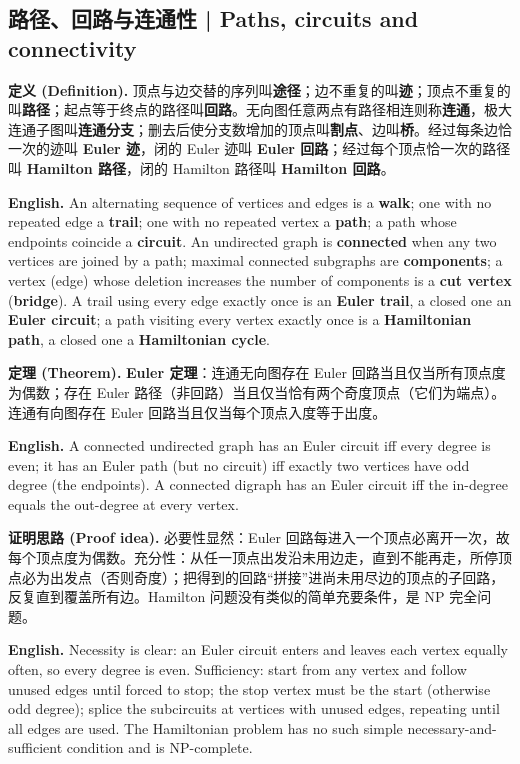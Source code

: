 \documentclass[UTF8,11pt,a4paper]{ctexart}
\newcommand{\EN}[1]{\par\noindent \textbf{English.} #1\par}
\newcommand{\DEF}[2]{\par\noindent\textbf{定义 (Definition).} #1\par\EN{#2}}
\newcommand{\THM}[2]{\par\noindent\textbf{定理 (Theorem).} #1\par\EN{#2}}
\newcommand{\PRF}[2]{\par\noindent\textbf{证明思路 (Proof idea).} #1\par\EN{#2}}
\begin{document}
\subsection{路径、回路与连通性 | Paths, circuits and connectivity}
\DEF{顶点与边交替的序列叫\textbf{途径}；边不重复的叫\textbf{迹}；顶点不重复的叫\textbf{路径}；起点等于终点的路径叫\textbf{回路}。无向图任意两点有路径相连则称\textbf{连通}，极大连通子图叫\textbf{连通分支}；删去后使分支数增加的顶点叫\textbf{割点}、边叫\textbf{桥}。经过每条边恰一次的迹叫 \textbf{Euler 迹}，闭的 Euler 迹叫 \textbf{Euler 回路}；经过每个顶点恰一次的路径叫 \textbf{Hamilton 路径}，闭的 Hamilton 路径叫 \textbf{Hamilton 回路}。}{An alternating sequence of vertices and edges is a \textbf{walk}; one with no repeated edge a \textbf{trail}; one with no repeated vertex a \textbf{path}; a path whose endpoints coincide a \textbf{circuit}. An undirected graph is \textbf{connected} when any two vertices are joined by a path; maximal connected subgraphs are \textbf{components}; a vertex (edge) whose deletion increases the number of components is a \textbf{cut vertex} (\textbf{bridge}). A trail using every edge exactly once is an \textbf{Euler trail}, a closed one an \textbf{Euler circuit}; a path visiting every vertex exactly once is a \textbf{Hamiltonian path}, a closed one a \textbf{Hamiltonian cycle}.}
\THM{\textbf{Euler 定理}：连通无向图存在 Euler 回路当且仅当所有顶点度为偶数；存在 Euler 路径（非回路）当且仅当恰有两个奇度顶点（它们为端点）。连通有向图存在 Euler 回路当且仅当每个顶点入度等于出度。}{A connected undirected graph has an Euler circuit iff every degree is even; it has an Euler path (but no circuit) iff exactly two vertices have odd degree (the endpoints). A connected digraph has an Euler circuit iff the in-degree equals the out-degree at every vertex.}
\PRF{必要性显然：Euler 回路每进入一个顶点必离开一次，故每个顶点度为偶数。充分性：从任一顶点出发沿未用边走，直到不能再走，所停顶点必为出发点（否则奇度）；把得到的回路“拼接”进尚未用尽边的顶点的子回路，反复直到覆盖所有边。Hamilton 问题没有类似的简单充要条件，是 NP 完全问题。}{Necessity is clear: an Euler circuit enters and leaves each vertex equally often, so every degree is even. Sufficiency: start from any vertex and follow unused edges until forced to stop; the stop vertex must be the start (otherwise odd degree); splice the subcircuits at vertices with unused edges, repeating until all edges are used. The Hamiltonian problem has no such simple necessary-and-sufficient condition and is NP-complete.}
\end{document}
